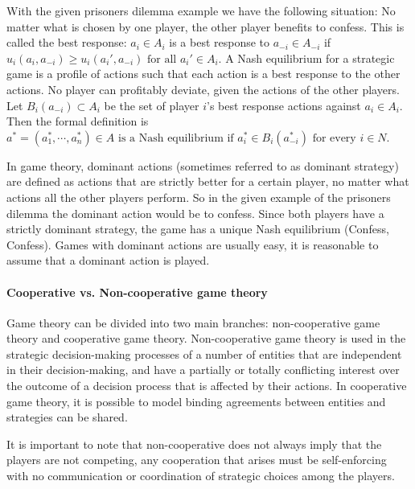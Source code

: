 With the given prisoners dilemma example we have the following situation: No matter what is chosen by one player, the other player benefits to confess. This is called the best response: $a_i \in A_i $ is a best response to $ a_{-i} \in A_{-i} $ if $u_i(a_i, a_{-i}) \geq u_i(a_{i}', a_{-i}) \mbox{ for all } a_{i}' \in A_i$.
A Nash equilibrium for a strategic game is a profile of actions such
that each action is a best response to the other actions. No player can profitably deviate, given the actions of the other players. Let $B_i(a_{-i}) \subset A_i$ be the set of player $i$'s best response actions against $a_i \in A_i$. Then the formal definition is
$a^* = (a^*_1, \cdots, a^*_n) \in A \mbox{ is a Nash equilibrium if }
	a^*_i \in B_i(a_{-i}^*) \mbox{ for every } i \in N$.

In game theory, dominant actions (sometimes referred to as dominant strategy) are defined as actions that are strictly better for a certain player, no matter what actions all the other players perform. So in the given example of the prisoners dilemma the dominant action would be to confess. Since both players have a strictly dominant strategy, the game has a unique Nash equilibrium (Confess, Confess). Games with dominant actions are usually easy, it is reasonable to assume that a dominant action is played. 

\paragraph{Cooperative vs. Non-cooperative game theory} 
Game theory can be divided into two main branches: non-cooperative game theory and cooperative game theory. Non-cooperative game theory is used in the strategic decision-making processes of a number of entities that are independent in their decision-making, and have a partially or totally conflicting interest over the outcome of a decision process that is affected by their actions\cite{keypaper}. In cooperative game theory, it is possible to model binding agreements between entities and strategies can be shared. 

It is important to note that non-cooperative does not always imply that the players are not competing, any cooperation that arises must be self-enforcing with no communication or coordination of strategic choices among the players.

